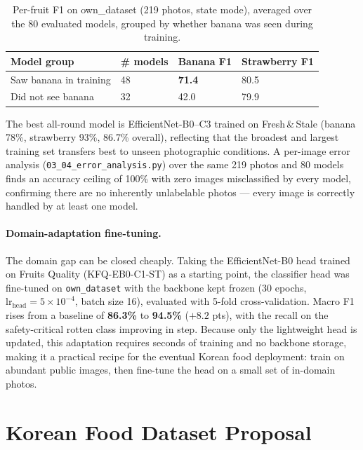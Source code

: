 \documentclass[12pt, a4paper]{article}
\begin{document}
\begin{table}[h]
\centering
\caption{Per-fruit F1 on own\_dataset (219 photos, state mode), averaged over
the 80 evaluated models, grouped by whether banana was seen during training.}
\label{tab:perfruit}
\setlength{\tabcolsep}{6pt}
\begin{tabular}{L{5.0cm} C{1.6cm} C{2.2cm} C{2.4cm}}
\toprule
\textbf{Model group} & \textbf{\# models} & \textbf{Banana F1} & \textbf{Strawberry F1} \\
\midrule
Saw banana in training      & 48 & \textbf{71.4} & 80.5 \\
Did not see banana          & 32 & 42.0 & 79.9 \\
\bottomrule
\end{tabular}
\end{table}

The best all-round model is EfficientNet-B0--C3 trained on Fresh\,\&\,Stale
(banana 78\%, strawberry 93\%, 86.7\% overall), reflecting that the broadest and
largest training set transfers best to unseen photographic conditions.
A per-image error analysis (\texttt{03\_04\_error\_analysis.py}) over the same
219 photos and 80 models finds an accuracy ceiling of 100\% with zero images
misclassified by every model, confirming there are no inherently unlabelable
photos --- every image is correctly handled by at least one model.

\paragraph{Domain-adaptation fine-tuning.}
The domain gap can be closed cheaply.
Taking the EfficientNet-B0 head trained on Fruits Quality (KFQ-EB0-C1-ST) as a
starting point, the classifier head was fine-tuned on \texttt{own\_dataset} with
the backbone kept frozen (30 epochs, $\text{lr}_\text{head} = 5\times10^{-4}$,
batch size 16), evaluated with 5-fold cross-validation.
Macro F1 rises from a baseline of \textbf{86.3\%} to \textbf{94.5\%}
($+8.2$ pts), with the recall on the safety-critical rotten class improving in
step.
Because only the lightweight head is updated, this adaptation requires seconds of
training and no backbone storage, making it a practical recipe for the eventual
Korean food deployment: train on abundant public images, then fine-tune the head
on a small set of in-domain photos.

\section{Korean Food Dataset Proposal}
\end{document}
